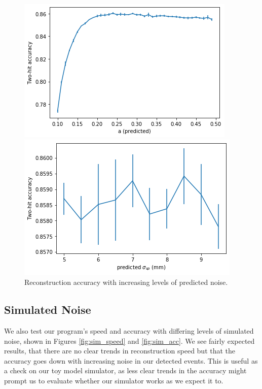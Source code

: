 \begin{figure}
        \centering
        \begin{minipage}{0.49\textwidth} \centering
        \includegraphics[width=\textwidth]{graphs/pi_enFactor_acc.png}
        \end{minipage}
        \begin{minipage}{0.49\textwidth} \centering
        \includegraphics[width=\textwidth]{graphs/pi_spFactor_acc.png}
        \end{minipage}
        \caption{Reconstruction accuracy with increasing levels of predicted noise.}
        \label{fig:predicted_acc}
\end{figure}

\subsection*{Simulated Noise}
We also test our program's speed and accuracy with differing levels of simulated noise, shown in Figures \ref{fig:sim_speed} and \ref{fig:sim_acc}. We see fairly expected results, that there are no clear trends in reconstruction speed but that the accuracy goes down with increasing noise in our detected events. This is useful as a check on our toy model simulator, as less clear trends in the accuracy might prompt us to evaluate whether our simulator works as we expect it to.

